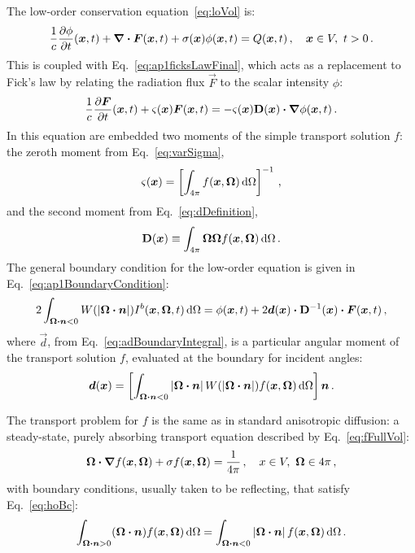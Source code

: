 The low-order conservation equation~\eqref{eq:loVol} is:
\begin{equation*}
\frac{1}{c} \frac{\partial \phi}{\partial t} (\bm{x}, t)
+ \bm{\nabla} \bm{\cdot} \bm{F}(\bm{x},t)
+ \sigma(\bm{x}) \phi(\bm{x}, t)
  = Q(\bm{x}, t) \,,
  \quad \bm{x} \in V,\ t > 0 \,.
\end{equation*}
This is coupled with Eq.~\eqref{eq:ap1ficksLawFinal}, which acts as a
replacement to Fick's law by relating the radiation flux $\vec{F}$ to the
scalar intensity $\phi$:
\begin{equation*}
  \frac{1}{c}\frac{\partial \bm{F}}{\partial t}(\bm{x},t) + \varsigma(\bm{x})\bm{F}(\bm{x},t) 
  = - \varsigma(\bm{x}) \mathbf{D}(\bm{x}) \bm{\cdot} \bm{\nabla} \phi(\bm{x}, t) \,.
\end{equation*}
In this equation are embedded two moments of the simple transport solution $f$:
the zeroth moment from Eq.~\eqref{eq:varSigma},
\begin{equation*}
  \varsigma(\bm{x})
  = \left[ \int_{4\pi} f(\bm{x},\bm{\Omega}) \mathop{}\!\mathrm{d} \Omega \right]^{-1} \,,
\end{equation*}
and the second moment from Eq.~\eqref{eq:dDefinition},
\begin{equation*}
  \mathbf{D}(\bm{x}) \equiv \int_{4\pi} \bm{\Omega} \bm{\Omega}
  f(\bm{x}, \bm{\Omega}) \mathop{}\!\mathrm{d}\Omega \,.
\end{equation*}
The general boundary condition for the low-order equation is given in
Eq.~\eqref{eq:ap1BoundaryCondition}:
\begin{equation*}
  2 \int_{\bm{\Omega}\bm{\cdot}\bm{n} < 0}
  W(\left| \bm{\Omega}\bm{\cdot}\bm{n} \right|) I^b(\bm{x},\bm{\Omega},t) \mathop{}\!\mathrm{d}\Omega
  = \phi(\bm{x},t)
  + 2 \bm{d}(\bm{x}) \bm{\cdot} \mathbf{D}^{-1}(\bm{x}) \bm{\cdot} \bm{F}(\bm{x},t) \,,
\end{equation*}
where $\vec{d}$, from Eq.~\eqref{eq:adBoundaryIntegral}, is a particular
angular moment of the transport solution $f$, evaluated at the boundary for
incident angles:
\begin{equation*}
  \bm{d}(\bm{x})
  = \left[ \int_{\bm{\Omega}\bm{\cdot}\bm{n} < 0}
  \left| \bm{\Omega}\bm{\cdot}\bm{n} \right| W(\left| \bm{\Omega}\bm{\cdot}\bm{n} \right|)
  f(\bm{x}, \bm{\Omega}) \mathop{}\!\mathrm{d}\Omega\right] \bm{n}\,.
\end{equation*}

The transport problem for $f$ is the same as in standard anisotropic diffusion:
a steady-state, purely absorbing transport
equation described by Eq.~\eqref{eq:fFullVol}:
\begin{equation*}
  \bm{\Omega}\bm{\cdot} \bm{\nabla} f(\bm{x}, \bm{\Omega})
  + \sigma f (\bm{x}, \bm{\Omega}) 
  = \frac{1}{4\pi} \,, \quad x \in V,\ \bm{\Omega} \in 4\pi\,,
\end{equation*}
with boundary conditions, usually taken to be reflecting, that satisfy
Eq.~\eqref{eq:hoBc}:
\begin{equation*}
  \int_{\bm{\Omega}\bm{\cdot}\bm{n} > 0} (\bm{\Omega}\bm{\cdot} \bm{n})
  f(\bm{x}, \bm{\Omega}) \mathop{}\!\mathrm{d}\Omega
  =
  \int_{\bm{\Omega}\bm{\cdot}\bm{n} < 0} \left| \bm{\Omega}\bm{\cdot} \bm{n} \right|
  f(\bm{x}, \bm{\Omega}) \mathop{}\!\mathrm{d}\Omega \,.
\end{equation*}

